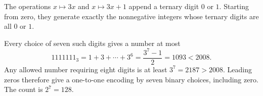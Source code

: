 The operations $x\mapsto3x$ and $x\mapsto3x+1$ append a ternary digit $0$ or $1$. Starting from zero, they generate exactly the nonnegative integers whose ternary digits are all $0$ or $1$.

Every choice of seven such digits gives a number at most
\[
1111111_3=1+3+\cdots+3^6=\dfrac{3^7-1}{2}=1093<2008.
\]
Any allowed number requiring eight digits is at least $3^7=2187>2008$. Leading zeros therefore give a one-to-one encoding by seven binary choices, including zero. The count is $\boxed{2^7=128}$.
